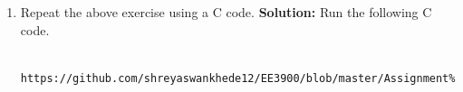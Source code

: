 \documentclass[journal,12pt,twocolumn]{IEEEtran}
\newcommand{\solution}{\noindent \textbf{Solution: }}
\numberwithin{equation}{section}
\renewcommand\thesection{\arabic{section}}
\renewcommand\thesection{\arabic{section}}
\begin{document}
\begin{enumerate}[label=\thesection.\arabic*,ref=\thesection.\theenumi]
\begin{figure}[!ht]
\begin{center}
	\end{center}
	\label{fig:xnyn}	
	\end{figure}
\\
\solution The following code yields Fig. \ref{fig:xnyn}.
\begin{lstlisting}
	https://github.com/shreyaswankhede12/EE3900/blob/master/Assignment%201/codes/qs%203/xn.py\\
	https://github.com/shreyaswankhede12/EE3900/blob/master/Assignment%201/codes/qs%203/yn.py
\end{lstlisting}
\item Repeat the above exercise using a C code.
\solution Run the following C code.
\begin{lstlisting}
	https://github.com/shreyaswankhede12/EE3900/blob/master/Assignment%201/codes/qs%203/xn_yn.C
\end{lstlisting}
\end{enumerate}
\end{document}
